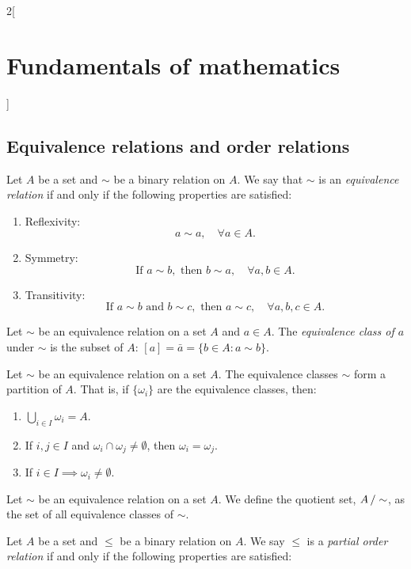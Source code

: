 \documentclass[../../../main.tex]{subfiles}
\begin{document}
\begin{multicols}{2}[\section{Fundamentals of mathematics}]
    \subsection{Equivalence relations and order relations}
    \begin{definition}
        Let $A$ be a set and $\sim$ be a binary relation on $A$. We say that $\sim$ is an \textit{equivalence relation} if and only if the following properties are satisfied:
        \begin{enumerate}
            \item Reflexivity: $$a\sim a,\quad\forall a\in A.$$
            \item Symmetry: $$\text{If }a\sim b, \text{ then }b\sim a,\quad\forall a,b\in A.$$
            \item Transitivity:
            $$\text{If }a\sim b\text{ and }b\sim c,\text{ then }a\sim c,\quad\forall a,b,c\in A.$$
        \end{enumerate}
    \end{definition}
    \begin{definition}
        Let $\sim$ be an equivalence relation on a set $A$ and $a\in A$. The \textit{equivalence class of $a$} under $\sim$ is the subset of $A$: $[a]=\bar{a}=\{b\in A: a\sim b\}$.
    \end{definition}
    \begin{theorem}
        Let $\sim$ be an equivalence relation on a set $A$. The equivalence classes $\sim$ form a partition of $A$. That is, if $\{\omega_i\}$ are the equivalence classes, then:
        \begin{enumerate}
            \item $\bigcup_{i\in I} \omega_i=A$.
            \item If $i,j\in I$ and $\omega_i\cap\omega_j\ne\emptyset$, then $\omega_i=\omega_j$.
            \item If $i\in I\implies\omega_i\ne\emptyset$.
        \end{enumerate}
    \end{theorem}
    \begin{definition}
        Let $\sim$ be an equivalence relation on a set $A$. We define the quotient set, $\quot{A}{\!\sim}$, as the set of all equivalence classes of $\sim$.
    \end{definition}
    \begin{definition}
        Let $A$ be a set and $\leq$ be a binary relation on $A$. We say $\leq$ is a \textit{partial order relation} if and only if the following properties are satisfied:

\end{definition}
\end{multicols}
\end{document}
